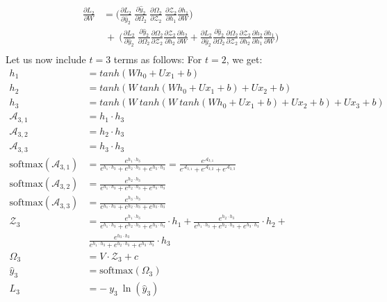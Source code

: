 \documentclass{article}
\begin{document}
\begin{align*}
	\frac{\partial L_2}{ \partial{W}} & = \biggl(\frac{\partial L_2}{\partial \hat{y}_2}~\frac{\partial \hat{y}_2}{\partial \Omega_2}~\frac{\partial \Omega_2}{ \partial \mathcal{Z}_2} ~ \frac{\partial \mathcal{Z}_2}{ \partial h_1} \frac{\partial h_1}{ \partial W} \biggl) \\
	& ~+~
	\biggl(\frac{\partial L_2}{\partial \hat{y}_2}~\frac{\partial \hat{y}_2}{\partial \Omega_2}\frac{\partial \Omega_2}{ \partial \mathcal{Z}_2} \frac{\partial \mathcal{Z}_2}{ \partial h_2} \frac{\partial h_2}{ \partial W}+ \frac{\partial L_2}{\partial \hat{y}_2}\frac{\partial \hat{y}_2}{\partial \Omega_2}\frac{\partial \Omega_2}{ \partial \mathcal{Z}_2} \frac{\partial \mathcal{Z}_2}{ \partial h_2} \frac{\partial h_2}{ \partial h_1}\frac{\partial h_1}{ \partial W}\biggl)\\
\end{align*}
\newpage
Let us now include $t=3$ terms as follows:
For $t=2$, we get:
\begin{align*}
	h_1 &= tanh(W h_0 +Ux_1 +b)\\
	h_2 &= tanh(W~tanh(W h_0 +Ux_1 +b)+Ux_2 +b)\\
	h_3 &= tanh(W~tanh(W~tanh(W h_0 +Ux_1 +b)+Ux_2 +b)+ U x_3 + b)\\
	\mathcal{A}_{3,1} &= h_1 \cdot h_3\\
	\mathcal{A}_{3,2} &=h_2 \cdot h_3 \\
	\mathcal{A}_{3,3} &=h_3 \cdot h_3 \\
	\text{softmax}(\mathcal{A}_{3,1}) &= \frac{e^{h_1 \cdot h_3 }}
	{e^{h_1 \cdot h_3}+e^{h_2 \cdot h_3}+e^{h_3 \cdot h_3}} = \frac{e^{\mathcal{A}_{3,1}}}
	{e^{\mathcal{A}_{3,1}}+e^{\mathcal{A}_{3,2}}+e^{\mathcal{A}_{3,3}}}\\
	\text{softmax}(\mathcal{A}_{3,2}) &= \frac{e^{h_2 \cdot h_3 }}
	{e^{h_1 \cdot h_3}+e^{h_2 \cdot h_3}+e^{h_3 \cdot h_3}}\\
	\text{softmax}(\mathcal{A}_{3,3}) &= \frac{e^{h_3 \cdot h_3 }}
	{e^{h_1 \cdot h_3}+e^{h_2 \cdot h_3}+e^{h_3 \cdot h_3}}\\
	\mathcal{Z}_3 &= \frac{e^{h_1 \cdot h_3 }}
	{e^{h_1 \cdot h_3}+e^{h_2 \cdot h_3}+e^{h_3 \cdot h_3}}\cdot h_1+
	\frac{e^{h_2 \cdot h_3 }}
	{e^{h_1 \cdot h_3}+e^{h_2 \cdot h_3}+e^{h_3 \cdot h_3}}\cdot h_2+\\
	&~\frac{e^{h_3 \cdot h_3 }}
	{e^{h_1 \cdot h_3}+e^{h_2 \cdot h_3}+e^{h_3 \cdot h_3}}\cdot h_3
	\\
	\Omega_3 &= V \cdot \mathcal{Z}_3 + c\\
	\hat{y}_3 &= \text{softmax}(\Omega_3)\\
	L_3 &= -~y_3~\ln{(\hat{y}_3)}
\end{align*}
\end{document}
